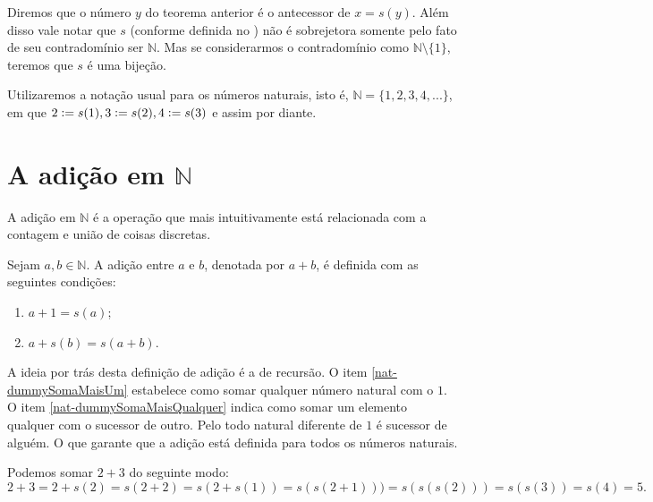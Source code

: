 \documentclass[../main.tex]{subfiles}
\begin{document}
\begin{obs}
    Diremos que o número $y$ do teorema anterior é o antecessor de $x = s(y)$. Além disso vale notar que $s$ (conforme definida no ) não é sobrejetora somente pelo fato de seu contradomínio ser $\mathbb{N}$. Mas se considerarmos o contradomínio como $\mathbb{N} \setminus \{1\}$, teremos que $s$ é uma bijeção.
\end{obs}

Utilizaremos a notação usual para os números naturais, isto é, $\mathbb{N} = \{ 1, 2, 3, 4, ...\}$, em que $2 \vcentcolon= s(1), 3 \vcentcolon= s(2), 4 \vcentcolon= s(3)$ e assim por diante.



\section{A adição em $\mathbb{N}$}
A adição em $\mathbb{N}$ é a operação que mais intuitivamente está relacionada com a contagem e união de coisas discretas.
\begin{defi}\label{nat-def-soma}
Sejam $a, b \in \mathbb{N}$. A adição entre $a$ e $b$, denotada por $a + b$, é definida com as seguintes condições: 
    \begin{enumerate}[label=(\roman*)]
        \item\label{nat-dummySomaMaisUm} $a + 1 = s(a)$;
        \item\label{nat-dummySomaMaisQualquer} $a + s(b) = s(a+b)$.
    \end{enumerate}
\end{defi}
A ideia por trás desta definição de adição é a de recursão. O item \ref{nat-dummySomaMaisUm} estabelece como somar qualquer número natural com o $1$. O item \ref{nat-dummySomaMaisQualquer} indica como somar um elemento qualquer com o sucessor de outro. Pelo  todo natural diferente de $1$ é sucessor de alguém. O que garante que a adição está definida para todos os números naturais.
\begin{ex}
    Podemos somar $2 + 3$ do seguinte modo:
    \[ 2+3 = 2+s(2) = s(2+2) = s(2+s(1)) = s(s(2+1))) = s(s(s(2))) = s(s(3))=s(4)=5. \]
\end{ex}
\end{document}
